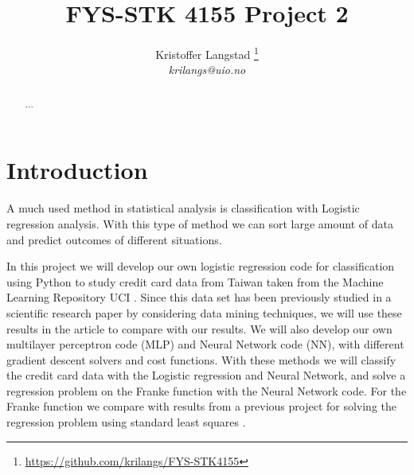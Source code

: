 \documentclass[12pt,a4paper,english]{article}
\title{FYS-STK 4155 Project 2}
\date{}
\author{ Kristoffer Langstad \footnote{\url{https://github.com/krilangs/FYS-STK4155}}\\ \textit{krilangs@uio.no}}
\begin{document}
\maketitle
\begin{abstract}
	...
\end{abstract}

\section{Introduction}
\label{sect:Intro}
A much used method in statistical analysis is classification with Logistic regression analysis. With this type of method we can sort large amount of data and predict outcomes of different situations. 

In this project we will develop our own logistic regression code for classification using Python to study credit card data from Taiwan taken from the Machine Learning Repository UCI \cite{UCI}. Since this data set has been previously studied in a scientific research paper by \citet{origarticle} considering data mining techniques, we will use these results in the article to compare with our results. We will also develop our own multilayer perceptron code (MLP) and Neural Network code (NN), with different gradient descent solvers and cost functions. With these methods we will classify the credit card data with the Logistic regression and Neural Network, and solve a regression problem on the Franke function with the Neural Network code. For the Franke function we compare with results from a previous project for solving the regression problem using standard least squares \cite{proj1}.
\end{document}
